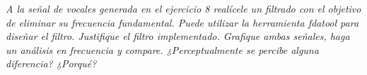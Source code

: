 


\emph{A la señal de vocales generada en el ejercicio 8 realícele un filtrado con el objetivo de eliminar su
frecuencia fundamental. Puede utilizar la herramienta fdatool para diseñar el filtro. Justifique el
filtro implementado. Grafique ambas señales, haga un análisis en frecuencia y compare.
¿Perceptualmente se percibe alguna diferencia? ¿Porqué?}

